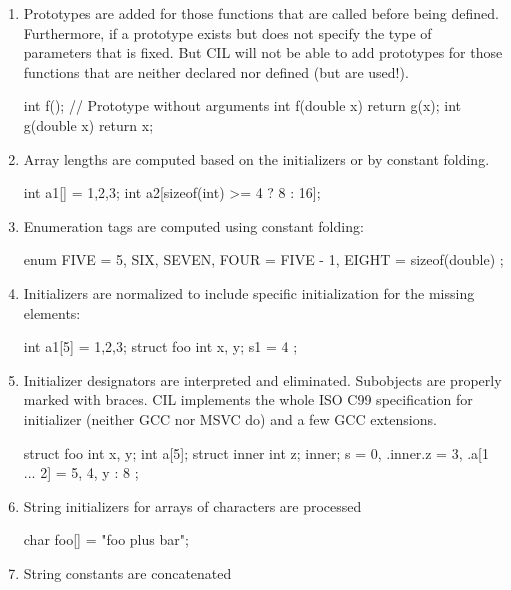 \documentclass{article}
\begin{document}
\begin{enumerate}
\item Prototypes are added for those functions that are called before being
defined. Furthermore, if a prototype exists but does not specify the type of
parameters that is fixed. But CIL will not be able to add prototypes for those
functions that are neither declared nor defined (but are used!).
\begin{cilcode}[global]
  int f();  // Prototype without arguments
  int f(double x) {
      return g(x);
  }
  int g(double x) {
     return x;
  } 
\end{cilcode}

\item Array lengths are computed based on the initializers or by constant
folding.
\begin{cilcode}[global]
  int a1[] = {1,2,3};
  int a2[sizeof(int) >= 4 ? 8 : 16];
\end{cilcode}

\item Enumeration tags are computed using constant folding:
\begin{cilcode}[global]
  enum { 
     FIVE = 5, 
     SIX, SEVEN, 
     FOUR = FIVE - 1, 
     EIGHT = sizeof(double)
  };
\end{cilcode}

\item Initializers are normalized to include specific initialization for the
missing elements:
\begin{cilcode}[global]
  int a1[5] = {1,2,3};
  struct foo { int x, y; } s1 = { 4 };
\end{cilcode}

\item Initializer designators are interpreted and eliminated. Subobjects are
properly marked with braces. CIL implements
the whole ISO C99 specification for initializer (neither GCC nor MSVC do) and
a few GCC extensions. 
\begin{cilcode}[global]
  struct foo { 
     int x, y; 
     int a[5];
     struct inner {
        int z;
     } inner;
  } s = { 0, .inner.z = 3, .a[1 ... 2] = 5, 4, y : 8 };
\end{cilcode}

\item String initializers for arrays of characters are processed

\begin{cilcode}[global]
char foo[] = "foo plus bar";
\end{cilcode}

\item String constants are concatenated


\end{enumerate}
\end{document}
